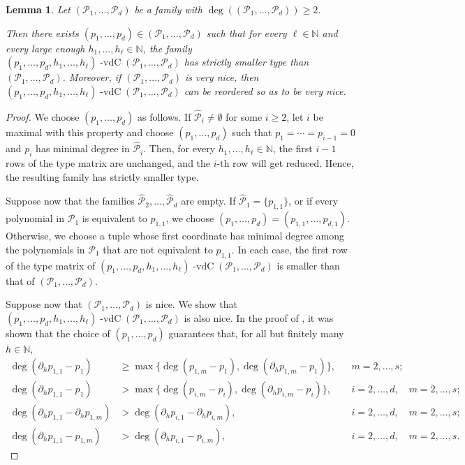 \documentclass[11pt,reqno]{amsart}
\newcommand{\N}{\mathbb{N}}
\newcommand{\cP}{{\mathcal P}}
\DeclareMathOperator{\vdc}{-vdC}
\newtheorem{lemma}[lemma]{Lemma}
\theoremstyle{definition}
\theoremstyle{remark}
\begin{document}
\begin{lemma}\label{lemma: reduce_type}
Let $(\cP_1,\ldots, \cP_d)$ be a family with $\deg((\cP_1,\dots,\cP_d))\geq 2$. 

Then there exists $(p_1,\ldots,p_d)\in (\cP_1,\ldots,\cP_d)$ such that for every $\ell\in\mathbb N$ and every large enough $h_1,\dots,h_\ell\in\N$, the family  $(p_1,\ldots,p_d,h_1,\dots,h_\ell)\vdc(\cP_1,\ldots, \cP_d)$ has strictly smaller type than $(\cP_1,\ldots, \cP_d)$. Moreover, if $(\cP_1,\ldots,\cP_d)$ is very nice, then $(p_1,\ldots,p_d,h_1,\dots,h_\ell)\vdc(\cP_1,\ldots, \cP_d)$ can be reordered so as to be very nice.
\end{lemma}
\begin{proof}
We choose $(p_1,\dots,p_d)$ as follows. If $\widehat{\cP}_i\neq\emptyset$ for some $i\geq 2$, let $i$ be maximal with this property and choose $(p_1,\dots,p_d)$ such that $p_1=\cdots=p_{i-1}=0$ and $p_i$ has minimal degree in $\widehat{\cP}_i$. Then, for every $h_1,\dots,h_\ell\in\mathbb N$, the first $i-1$ rows of the type matrix are unchanged, and the $i$-th row will get reduced. Hence, the resulting family has strictly smaller type.

Suppose now that the families $\widehat{\cP}_2,\dots,\widehat{\cP}_d$ are empty. If $\widehat{\cP}_1=\{p_{1,1}\}$, or if every polynomial in $\cP_1$ is equivalent to $p_{1,1}$, we choose $(p_1,\dots,p_d)=(p_{1,1},\dots,p_{d,1})$. Otherwise, we choose a tuple whose first coordinate has minimal degree among the polynomials in $\cP_1$ that are not equivalent to $p_{1,1}$. In each case, the first row of the type matrix of $(p_1,\ldots,p_d,h_1,\dots,h_\ell)\vdc(\cP_1,\ldots, \cP_d)$ is smaller than that of $(\cP_1,\dots,\cP_d)$. 

Suppose now that $(\cP_1,\dots,\cP_d)$ is nice. We show that $(p_1,\ldots,p_d,h_1,\dots,h_\ell)\vdc(\cP_1,\ldots, \cP_d)$ is also nice. In the proof of {\cite[Lemma 5.4]{Chu_Frantzikinakis_Host_ergodic_averages_distinct_degree:2011}}, it was shown that the choice of $(p_1,\dots,p_d)$ guarantees that, for all but finitely many $h\in\mathbb N$,\begin{align*}
\deg(\partial_h p_{1,1}-p_1)
&\geq \max\{\deg(p_{1,m}-p_1),\deg(\partial_h p_{1,m}-p_1)\},
&&m=2,\dots,s;\\
\deg(\partial_h p_{1,1}-p_1)
&> \max\{\deg(p_{i,m}-p_i),\deg(\partial_h p_{i,m}-p_i)\},
&&i=2,\dots,d,\quad m=2,\dots,s;\\
\deg(\partial_h p_{1,1}-\partial_h p_{1,m})
&>\deg(\partial_h p_{i,1}-\partial_h p_{i,m}),
&&i=2,\dots,d,\quad m=2,\dots,s;\\
\deg(\partial_h p_{1,1}-p_{1,m})
&>\deg(\partial_h p_{i,1}-p_{i,m}),
&&i=2,\dots,d,\quad m=2,\dots,s.
\end{align*}


\end{proof}
\end{document}
